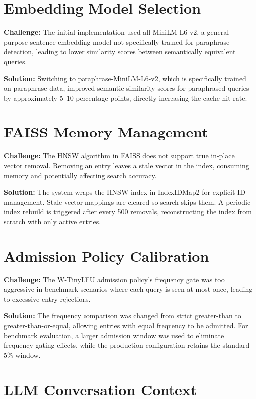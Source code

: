 \documentclass[12pt,a4paper]{report}
\begin{document}
\section{Embedding Model Selection}

\textbf{Challenge:} The initial implementation used all-MiniLM-L6-v2, a general-purpose sentence embedding model not specifically trained for paraphrase detection, leading to lower similarity scores between semantically equivalent queries.

\textbf{Solution:} Switching to paraphrase-MiniLM-L6-v2, which is specifically trained on paraphrase data, improved semantic similarity scores for paraphrased queries by approximately 5--10 percentage points, directly increasing the cache hit rate.

\section{FAISS Memory Management}

\textbf{Challenge:} The HNSW algorithm in FAISS does not support true in-place vector removal. Removing an entry leaves a stale vector in the index, consuming memory and potentially affecting search accuracy.

\textbf{Solution:} The system wraps the HNSW index in IndexIDMap2 for explicit ID management. Stale vector mappings are cleared so search skips them. A periodic index rebuild is triggered after every 500 removals, reconstructing the index from scratch with only active entries.

\section{Admission Policy Calibration}

\textbf{Challenge:} The W-TinyLFU admission policy's frequency gate was too aggressive in benchmark scenarios where each query is seen at most once, leading to excessive entry rejections.

\textbf{Solution:} The frequency comparison was changed from strict greater-than to greater-than-or-equal, allowing entries with equal frequency to be admitted. For benchmark evaluation, a larger admission window was used to eliminate frequency-gating effects, while the production configuration retains the standard 5\% window.

\section{LLM Conversation Context}
\end{document}
